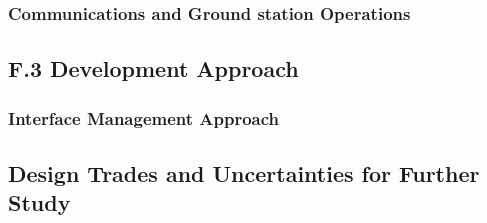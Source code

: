 \documentclass[12pt,journal]{IEEEtran}
\begin{document}
\subsubsection{Communications and Ground station Operations}

\subsection{F.3 Development Approach }

\subsubsection{Interface Management Approach}


\subsection{Design Trades and Uncertainties for Further Study}\label{sec:trades}
\end{document}
